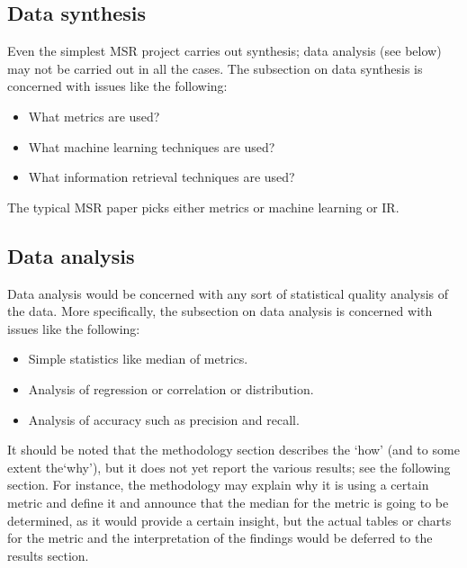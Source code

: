 
\subsection{Data synthesis}

Even the simplest MSR project carries out synthesis; data analysis (see
below) may not be carried out in all the cases. The subsection on data
synthesis is concerned with issues like the following:

\begin{itemize}

\item What metrics are used?

\item What machine learning techniques are used?

\item What information retrieval techniques are used?

\end{itemize}

The typical MSR paper picks either metrics or machine learning or IR.

\subsection{Data analysis}

Data analysis would be concerned with any sort of statistical quality
analysis of the data. More specifically, the subsection on data
analysis is concerned with issues like the following:

\begin{itemize}

\item Simple statistics like median of metrics.

\item Analysis of regression or correlation or distribution.

\item Analysis of accuracy such as precision and recall.

\end{itemize}

It should be noted that the methodology section describes the `how'
(and to some extent the`why'), but it does not yet report the various
results; see the following section. For instance, the methodology may
explain why it is using a certain metric and define it and announce
that the median for the metric is going to be determined, as it would
provide a certain insight, but the actual tables or charts for the
metric and the interpretation of the findings would be deferred to the
results section.
